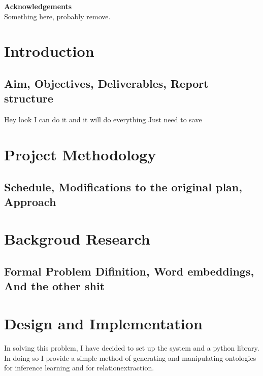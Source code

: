 \documentclass[11pt]{article} %
\begin{document}
\pagestyle{empty}
\tableofcontents %
\newpage %

\vspace{5cm}

\begin{center}
\begin{minipage}{0.8\textwidth}
\centering
\textbf{Acknowledgements}\\[1cm]

Something here, probably remove.

\end{minipage}
\end{center}

\newpage

\pagestyle{plain}
\setcounter{page}{1}


\section{Introduction}
\subsection{Aim, Objectives, Deliverables, Report structure}

Hey look I can do it and it will do everything Just need to save

\section{Project Methodology}
\subsection{Schedule, Modifications to the original plan, Approach}
\section{Backgroud Research}
\subsection{Formal Problem Difinition, Word embeddings, And the other shit}

\section{Design and Implementation}

In solving this problem, I have decided to set up the system and a python library. In doing so
I provide a simple method of generating and manipulating ontologies for inference learning and for
relationextraction.
\end{document}
